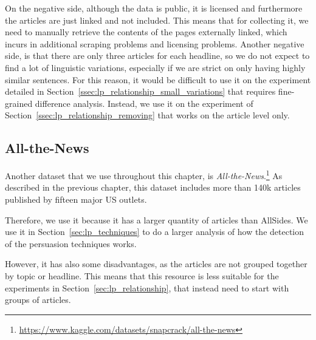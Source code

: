 On the negative side, although the data is public, it is licensed and furthermore the articles are just linked and not included.
This means that for collecting it, we need to manually retrieve the contents of the pages externally linked, which incurs in additional scraping problems and licensing problems.
Another negative side,
is that there are only three articles for each headline, so we do not expect to find a lot of linguistic variations, especially if we are strict on only having highly similar sentences. For this reason, it would be difficult to use it on the experiment detailed in Section~\ref{ssec:lp_relationship_small_variations} that requires fine-grained difference analysis.
Instead, we use it on the experiment of Section~\ref{ssec:lp_relationship_removing} that works on the article level only.

\subsection{All-the-News}

Another dataset that we use throughout this chapter, is \emph{All-the-News}.\footnote{\url{https://www.kaggle.com/datasets/snapcrack/all-the-news}}
As described in the previous chapter, this dataset includes more than 140k articles published by fifteen major US outlets.

Therefore, we use it because it has a larger quantity of articles than AllSides. We use it in Section~\ref{sec:lp_techniques} to do a larger analysis of how the detection of the persuasion techniques works.

However, it has also some disadvantages, as the articles are not grouped together by topic or headline.
This means that this resource is less suitable for the experiments in Section~\ref{sec:lp_relationship}, that instead need to start with groups of articles.

